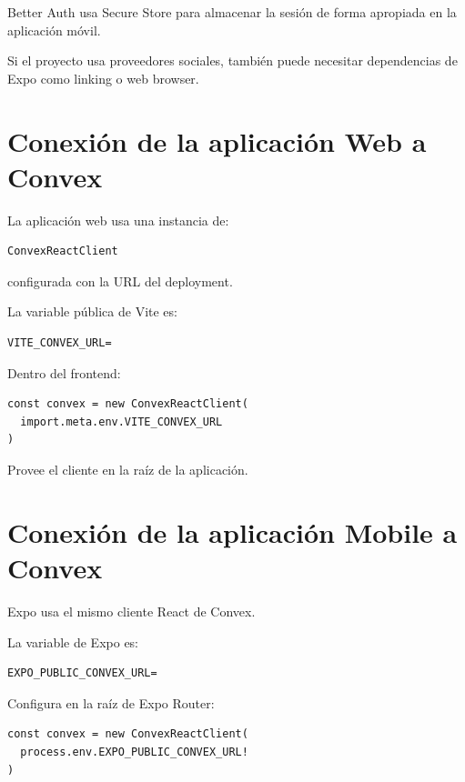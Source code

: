 \documentclass[11pt,a4paper]{article}
\begin{document}
Better Auth usa Secure Store para almacenar la sesión de forma apropiada en la
aplicación móvil.

Si el proyecto usa proveedores sociales, también puede necesitar dependencias
de Expo como linking o web browser.

\section{Conexión de la aplicación Web a Convex}

La aplicación web usa una instancia de:

\begin{lstlisting}
ConvexReactClient
\end{lstlisting}

configurada con la URL del deployment.

La variable pública de Vite es:

\begin{lstlisting}
VITE_CONVEX_URL=
\end{lstlisting}

Dentro del frontend:

\begin{lstlisting}
const convex = new ConvexReactClient(
  import.meta.env.VITE_CONVEX_URL
)
\end{lstlisting}

Provee el cliente en la raíz de la aplicación.

\section{Conexión de la aplicación Mobile a Convex}

Expo usa el mismo cliente React de Convex.

La variable de Expo es:

\begin{lstlisting}
EXPO_PUBLIC_CONVEX_URL=
\end{lstlisting}

Configura en la raíz de Expo Router:

\begin{lstlisting}
const convex = new ConvexReactClient(
  process.env.EXPO_PUBLIC_CONVEX_URL!
)
\end{lstlisting}
\end{document}
